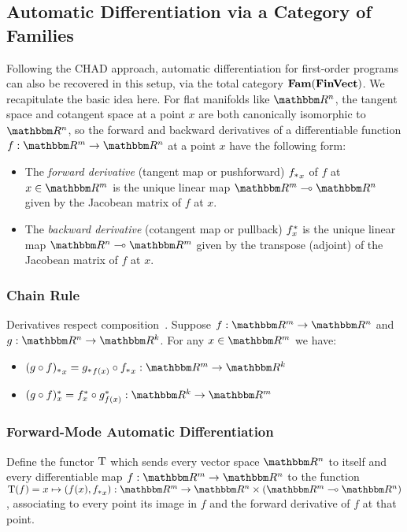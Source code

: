 \subsection{Automatic Differentiation via a Category of Families}

Following the CHAD approach, automatic differentiation for first-order programs can also be recovered in this
setup, via the total category $\mathbf{Fam}(\mathbf{FinVect})$. We recapitulate the basic idea here. For flat manifolds like
$\RR^n$, the tangent space and cotangent space at a point $x$ are both canonically isomorphic to $\RR^n$, so
the forward and backward derivatives of a differentiable function $f: \RR^m \to \RR^n$ at a point $x$ have the
following form:

\begin{itemize}
\item The \emph{forward derivative} (tangent map or pushforward) ${f_{*}}_x$ of $f$ at $x \in \RR^m$ is the
unique linear map $\RR^m \linearto \RR^n$ given by the Jacobean matrix of $f$ at $x$.
\item The \emph{backward derivative} (cotangent map or pullback) $f^{*}_x$ is the unique linear map
$\RR^n \linearto \RR^m$ given by the transpose (adjoint) of the Jacobean matrix of $f$ at $x$.
\end{itemize}

\subsubsection{Chain Rule}

Derivatives respect composition~\cite{spivak65}. Suppose $f: \RR^m \to \RR^n$ and $g: \RR^n \to \RR^k$. For
any $x \in \RR^m$ we have:

\begin{itemize}
\item $\pushf{(g \comp f)}_x = \pushf{g}_{f(x)} \comp \pushf{f}_x: \RR^m \to \RR^k$
\item $\pullf{(g \comp f)}_x = \pullf{f}_{x} \comp \pullf{g}_{f(x)}: \RR^k \to \RR^m$
\end{itemize}

\subsubsection{Forward-Mode Automatic Differentiation}

\begin{definition}
Define the functor $\mathrm{T}$ which sends every vector space $\RR^n$ to itself and every differentiable map
$f: \RR^m \to \RR^n$ to the function $\tangents(f) = x \mapsto (f(x), \pushf{f}_x): \RR^m \to \RR^n \times
(\RR^m \linearto \RR^n)$, associating to every point its image in $f$ and the forward derivative of $f$ at
that point.
\end{definition}

